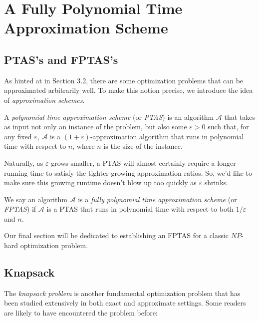 \documentclass{article}
\newenvironment{definition}[2][Definition]{\begin{trivlist}
\item[\hskip \labelsep {\bfseries #1}\hskip \labelsep {\hspace{-1ex}\bfseries #2.}]}{\end{trivlist}}
\begin{document}
\section{A Fully Polynomial Time Approximation Scheme}

\subsection{PTAS's and FPTAS's}

As hinted at in Section 3.2, there are some optimization problems that can be approximated arbitrarily well. To make this notion precise, we introduce the idea of \textit{approximation schemes}.

\begin{definition}{ (PTAS)}{}
    A \textit{polynomial time approximation scheme} (or \textit{PTAS}) is an algorithm $\mathcal{A}$ that takes as input not only an instance of the problem, but also some $\varepsilon > 0$ such that, for any fixed $\varepsilon$, $\mathcal{A}$ is a $(1+\varepsilon)$-approximation algorithm that runs in polynomial time with respect to $n$, where $n$ is the size of the instance.
\end{definition}

\noindent Naturally, as $\varepsilon$ grows smaller, a PTAS will almost certainly require a longer running time to satisfy the tighter-growing approximation ratios. So, we'd like to make sure this growing runtime doesn't blow up too quickly as $\varepsilon$ shrinks.

\begin{definition}{ (FPTAS)}{}
    We say an algorithm $\mathcal{A}$ is a \textit{fully polynomial time approximation scheme} (or \textit{FPTAS}) if $\mathcal{A}$ is a PTAS that runs in polynomial time with respect to both $1/\varepsilon$ and $n$.
\end{definition}

\noindent Our final section will be dedicated to establishing an FPTAS for a classic $NP$-hard optimization problem.
\vspace{-1.65ex}
\subsection{Knapsack}

The \textit{knapsack problem} is another fundamental optimization problem that has been studied extensively in both exact and approximate settings. Some readers are likely to have encountered the problem before:
\end{document}
